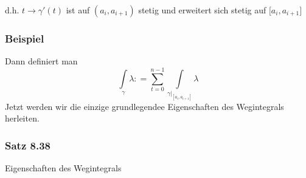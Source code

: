\begin{enumerate}
\noindent d.h. $t\to\gamma'(t)$ ist auf $\left( a_i, a_{i+1}\right)$ stetig und erweitert sich stetig auf $\lbrack a_i, a_{i+1}\rbrack$
\subsubsection*{Beispiel}
Dann definiert man
\[\int\limits_\gamma  \lambda  : = \sum\limits_{t = 0}^{n - 1} {\int\limits_{{{\left. \gamma  \right|}_{\left[ {{a_i},{a_{i + 1}}} \right]}}} \lambda  } \]
Jetzt werden wir die einzige grundlegendee Eigenschaften des Wegintegrals herleiten.
\end{enumerate}

\subsubsection*{Satz 8.38}
Eigenschaften des Wegintegrals 
